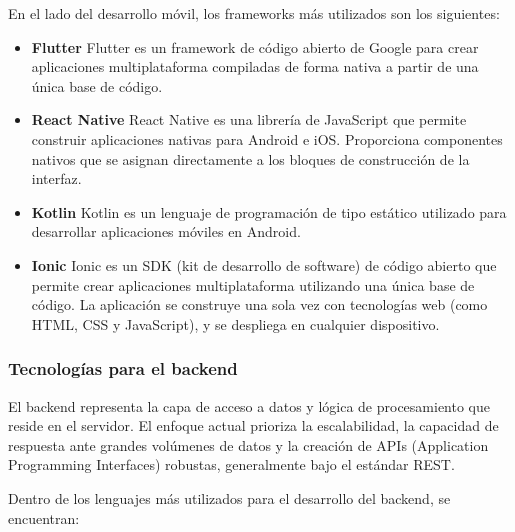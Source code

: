 En el lado del desarrollo móvil, los frameworks más utilizados son los siguientes:

\begin{itemize}
    \item \textbf{Flutter} \cite{flutter}
    \newline
    Flutter es un framework de código abierto de Google para crear aplicaciones multiplataforma compiladas de forma 
    nativa a partir de una única base de código.

    \item \textbf{React Native} \cite{reactNative}
    \newline
    React Native es una librería de JavaScript que permite construir aplicaciones nativas para Android e iOS. Proporciona 
    componentes nativos que se asignan directamente a los bloques de construcción de la interfaz.

    \item \textbf{Kotlin} \cite{kotlin}
    \newline
    Kotlin es un lenguaje de programación de tipo estático utilizado para desarrollar aplicaciones móviles en Android.

    \item \textbf{Ionic} \cite{ionic}
    \newline
    Ionic es un SDK (kit de desarrollo de software) de código abierto que permite crear aplicaciones multiplataforma 
    utilizando una única base de código. La aplicación se construye una sola vez con tecnologías web  (como HTML, CSS 
    y JavaScript), y se despliega en cualquier dispositivo. 
\end{itemize}

\subsubsection{Tecnologías para el backend}

El backend representa la capa de acceso a datos y lógica de procesamiento que reside en el servidor. El enfoque actual 
prioriza la escalabilidad, la capacidad de respuesta ante grandes volúmenes de datos y la creación de APIs (Application 
Programming Interfaces) robustas, generalmente bajo el estándar REST.

Dentro de los lenguajes más utilizados para el desarrollo del backend, se encuentran: 

